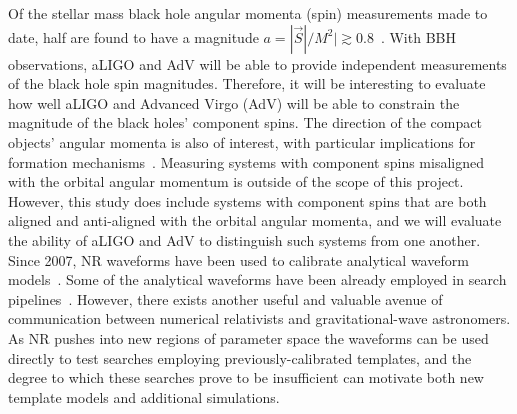 Of the stellar mass black hole angular momenta (spin) measurements made to 
date, half are found to have a magnitude
$a=|\vec{S}|/M^2|\gtrsim0.8$~\cite{McClintock:2011zq}. With BBH observations, aLIGO and AdV 
will be able to provide independent measurements of the black hole spin 
magnitudes. Therefore, it will be interesting
to evaluate how well aLIGO and Advanced Virgo (AdV)
will be able to constrain the magnitude of 
the black holes' component spins.
The direction of the compact objects' angular momenta is also
of interest, with particular implications for formation
mechanisms~\cite{Belczynski:2007xg}.  Measuring systems with component
spins misaligned with the orbital angular momentum is outside of the
scope of this project. However, this study does include systems with
component spins that are both aligned and anti-aligned with the
orbital angular momenta, and we will evaluate the ability of aLIGO and AdV to
distinguish such systems from one another.
% 
% 
Since
2007, NR waveforms have been used to calibrate analytical waveform
models~\cite{Buonanno:2007pf,Damour:2009kr,Pan:2011gk,Taracchini:2012ig,
Ajith:2009bn,Santamaria:2010yb,Damour:2012ky,Taracchini:2013rva}. Some
of the analytical waveforms have been already employed in search
pipelines~\cite{Aasi:2012rja}.  However, there exists another
useful and valuable avenue of communication between numerical
relativists and gravitational-wave astronomers.  As NR pushes into new
regions of parameter space the waveforms can be used directly to test
searches employing previously-calibrated templates, and the degree to
which these searches prove to be insufficient can motivate both new
template models and additional simulations.

